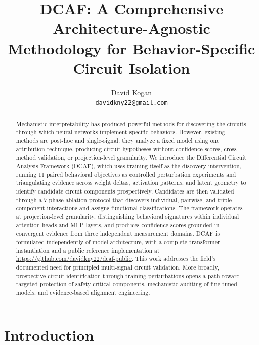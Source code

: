 \documentclass[11pt]{article}
\title{\textbf{DCAF: A Comprehensive Architecture-Agnostic\\ Methodology for Behavior-Specific Circuit Isolation}}
\author{David Kogan\\
\texttt{davidkny22@gmail.com}}
\date{\vspace{-2em}}
\begin{document}
\maketitle
\vspace{-1.5em}

\begin{abstract}
\noindent
Mechanistic interpretability has produced powerful methods for discovering the circuits through which neural networks implement specific behaviors. However, existing methods are post-hoc and single-signal: they analyze a fixed model using one attribution technique, producing circuit hypotheses without confidence scores, cross-method validation, or projection-level granularity. We introduce the Differential Circuit Analysis Framework (DCAF), which uses training itself as the discovery intervention, running 11 paired behavioral objectives as controlled perturbation experiments and triangulating evidence across weight deltas, activation patterns, and latent geometry to identify candidate circuit components prospectively. Candidates are then validated through a 7-phase ablation protocol that discovers individual, pairwise, and triple component interactions and assigns functional classifications. The framework operates at projection-level granularity, distinguishing behavioral signatures within individual attention heads and MLP layers, and produces confidence scores grounded in convergent evidence from three independent measurement domains. DCAF is formulated independently of model architecture, with a complete transformer instantiation and a public reference implementation at \url{https://github.com/davidkny22/dcaf-public}. This work addresses the field's documented need for principled multi-signal circuit validation. More broadly, prospective circuit identification through training perturbations opens a path toward targeted protection of safety-critical components, mechanistic auditing of fine-tuned models, and evidence-based alignment engineering.
\end{abstract}

\tableofcontents
\newpage

\section{Introduction}
\label{sec:introduction}
\end{document}
